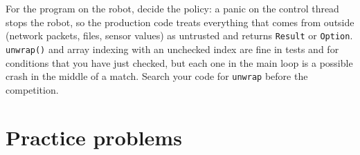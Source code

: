 \begin{aibox}
For the program on the robot, decide the policy: a panic on the control thread stops the robot, so the production code treats everything that comes from outside (network packets, files, sensor values) as untrusted and returns \verb!Result! or \verb!Option!. \verb!unwrap()! and array indexing with an unchecked index are fine in tests and for conditions that you have just checked, but each one in the main loop is a possible crash in the middle of a match. Search your code for \verb!unwrap! before the competition.
\end{aibox}

\section*{Practice problems}
